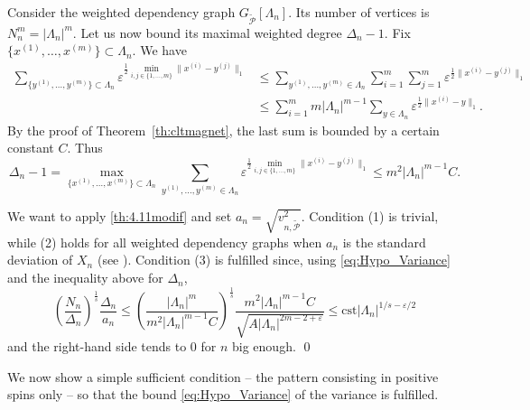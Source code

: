 \documentclass{amsart}
\def\WDep{G}
\def\eps{\varepsilon}
\def\GP{\mathcal{\tilde{P}}}
\newcommand{\dist}[2]{\|#1 - #2\|_1}
\numberwithin{equation}{section}
\theoremstyle{remark}
\renewenvironment{proof}[1][Proof]{\begin{trivlist}
\item[\hskip \labelsep {\bfseries #1:}]}{\qed\end{trivlist}}
\begin{document}
\begin{proof}
  [Proof of \cref{thm:GlobalPatterns}]
Consider the weighted dependency graph $\WDep_{\GP}[\Lambda_n]$.
Its number of vertices is $N_n^m = |\Lambda_n|^m$. Let us now bound its maximal weighted degree $\Delta_n-1$.
Fix $\{x^{(1)}, \dots ,x^{(m)}\} \subset \Lambda_n.$ We have
\begin{align*}
  \sum_{\{y^{(1)}, \dots , y^{(m)}\} \subset \Lambda_n} \eps^{\frac{1}{2} \min_{i,j \in \{1, \dots , m\}}\dist{x^{(i)}}{y^{(j)}}} &\leq \sum_{y^{(1)}, \dots , y^{(m)} \in \Lambda_n} \sum_{i=1}^m \sum_{j=1}^m \eps^{\frac{1}{2} \dist{x^{(i)}}{y^{(j)}}} \\
&\leq \sum_{i=1}^m m |\Lambda_n|^{m-1} \sum_{y \in \Lambda_n} \eps^{\frac{1}{2} \dist{x^{(i)}}{y}}.
\end{align*}
By the proof of Theorem~\ref{th:cltmagnet}, the last sum is bounded by a certain constant $C$. Thus
$$\Delta_n-1 = \max_{\{x^{(1)}, \dots ,x^{(m)}\} \subset \Lambda_n} \sum_{y^{(1)}, \dots , y^{(m)} \in \Lambda_n} \eps^{\frac{1}{2} \min_{i,j \in \{1, \dots , m\}}\dist{x^{(i)}}{y^{(j)}}} \leq m^2 |\Lambda_n|^{m-1} C.$$

We want to apply \cref{th:4.11modif} and set $a_n=\sqrt{v_{n,\GP}^2}$.
Condition (1) is trivial, while (2) holds for all weighted dependency graphs when $a_n$ is the standard deviation of $X_n$
(see \cite[Lemma 4.10]{Valentin}).
Condition (3) is fulfilled since, using \eqref{eq:Hypo_Variance} and the inequality above for $\Delta_n$,
\[\left( \frac{N_n}{\Delta_n} \right) ^{\frac{1}{s}} \frac{\Delta_n}{a_n} \le \left(\frac{|\Lambda_n|^m}{ m^2 |\Lambda_n|^{m-1} C}\right) ^{\frac{1}{s}} \frac{m^2 |\Lambda_n|^{m-1} C}{\sqrt{A |\Lambda_n|^{2m-2+\eps}}}
\le \text{cst} |\Lambda_n|^{1/s-\eps/2}\]
and the right-hand side tends to $0$ for $n$ big enough.
\end{proof}

We now show a simple sufficient condition -- the pattern consisting in positive spins only --
so that the bound \eqref{eq:Hypo_Variance} of the variance is fulfilled.
\end{document}

